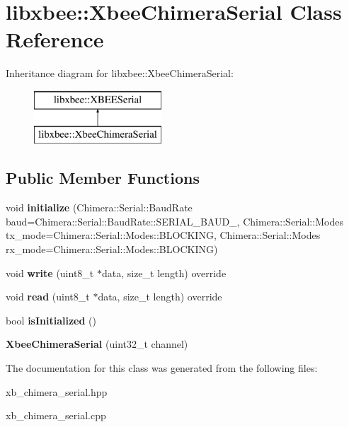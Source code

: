 \hypertarget{classlibxbee_1_1_xbee_chimera_serial}{}\section{libxbee\+:\+:Xbee\+Chimera\+Serial Class Reference}
\label{classlibxbee_1_1_xbee_chimera_serial}
Inheritance diagram for libxbee\+:\+:Xbee\+Chimera\+Serial\+:\begin{figure}[H]
\begin{center}
\leavevmode
\includegraphics[height=2.000000cm]{classlibxbee_1_1_xbee_chimera_serial}
\end{center}
\end{figure}
\subsection*{Public Member Functions}
\begin{DoxyCompactItemize}
\item 
\mbox{\label{classlibxbee_1_1_xbee_chimera_serial_a6b752002a4bc396f5c017d1288561fde}} 
void {\bfseries initialize} (Chimera\+::\+Serial\+::\+Baud\+Rate baud=Chimera\+::\+Serial\+::\+Baud\+Rate\+::\+S\+E\+R\+I\+A\+L\+\_\+\+B\+A\+U\+D\+\_, Chimera\+::\+Serial\+::\+Modes tx\+\_\+mode=Chimera\+::\+Serial\+::\+Modes\+::\+B\+L\+O\+C\+K\+I\+NG, Chimera\+::\+Serial\+::\+Modes rx\+\_\+mode=Chimera\+::\+Serial\+::\+Modes\+::\+B\+L\+O\+C\+K\+I\+NG)
\item 
\mbox{\label{classlibxbee_1_1_xbee_chimera_serial_acd9fd19475ab2a11852c1ef1c67f693a}} 
void {\bfseries write} (uint8\+\_\+t $\ast$data, size\+\_\+t length) override
\item 
\mbox{\label{classlibxbee_1_1_xbee_chimera_serial_a06a8ef328f631c7af8992d4b4afaceee}} 
void {\bfseries read} (uint8\+\_\+t $\ast$data, size\+\_\+t length) override
\item 
\mbox{\label{classlibxbee_1_1_xbee_chimera_serial_a0148328220564b7876930c94688907ef}} 
bool {\bfseries is\+Initialized} ()
\item 
\mbox{\label{classlibxbee_1_1_xbee_chimera_serial_a0fa7b20581a89fc89213f2b7a38e8315}} 
{\bfseries Xbee\+Chimera\+Serial} (uint32\+\_\+t channel)
\end{DoxyCompactItemize}


The documentation for this class was generated from the following files\+:\begin{DoxyCompactItemize}
\item 
xb\+\_\+chimera\+\_\+serial.\+hpp\item 
xb\+\_\+chimera\+\_\+serial.\+cpp\end{DoxyCompactItemize}
